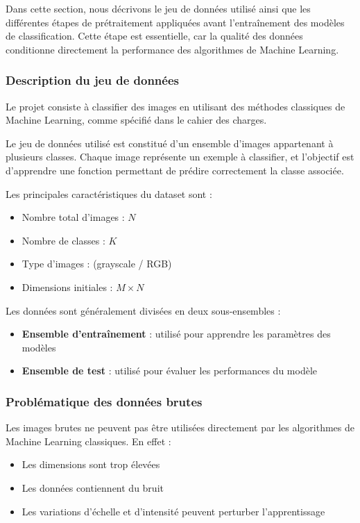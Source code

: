 \documentclass[12pt,a4paper]{article}
\begin{document}
    Dans cette section, nous décrivons le jeu de données utilisé ainsi que les différentes étapes de prétraitement appliquées avant l'entraînement des modèles de classification.
    Cette étape est essentielle, car la qualité des données conditionne directement la performance des algorithmes de Machine Learning.

    \subsubsection{Description du jeu de données}

    Le projet consiste à classifier des images en utilisant des méthodes classiques de Machine Learning, comme spécifié dans le cahier des charges.

    Le jeu de données utilisé est constitué d’un ensemble d’images appartenant à plusieurs classes.
    Chaque image représente un exemple à classifier, et l’objectif est d’apprendre une fonction permettant de prédire correctement la classe associée.

    Les principales caractéristiques du dataset sont :
    \begin{itemize}
        \item Nombre total d’images : \(N\)
        \item Nombre de classes : \(K\)
        \item Type d’images : (grayscale / RGB)
        \item Dimensions initiales : \(M \times N\)
    \end{itemize}

    Les données sont généralement divisées en deux sous-ensembles :
    \begin{itemize}
        \item \textbf{Ensemble d'entraînement} : utilisé pour apprendre les paramètres des modèles
        \item \textbf{Ensemble de test} : utilisé pour évaluer les performances du modèle
    \end{itemize}

    \subsubsection{Problématique des données brutes}

    Les images brutes ne peuvent pas être utilisées directement par les algorithmes de Machine Learning classiques.
    En effet :
    \begin{itemize}
        \item Les dimensions sont trop élevées
        \item Les données contiennent du bruit
        \item Les variations d’échelle et d’intensité peuvent perturber l’apprentissage
    \end{itemize}
\end{document}
